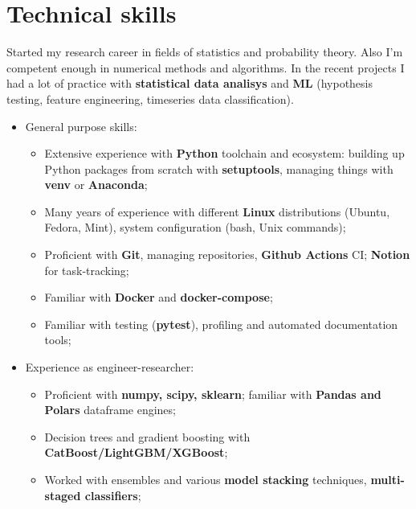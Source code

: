 \documentclass[12pt,a4paper,sans]{moderncv}
\begin{document}
\section{Technical skills}
\hspace{10mm} Started my research career in fields of statistics and probability theory. Also I'm competent enough in numerical methods and algorithms. \newline
In the recent projects I had a lot of practice with \textbf{statistical data analisys} and \textbf{ML} (hypothesis testing, feature engineering, timeseries data classification). \newline
 \begin{itemize}
 \item General purpose skills: \newline
    \begin{itemize}
        \item Extensive experience with \textbf{Python} toolchain and ecosystem: building up Python packages from scratch with \textbf{setuptools},
managing things with \textbf{venv} or \textbf{Anaconda}; \newline
        \item Many years of experience with different \textbf{Linux} distributions (Ubuntu, Fedora, Mint), system configuration (bash, Unix commands); \newline
        \item Proficient with \textbf{Git}, managing repositories, \textbf{Github Actions} CI; \textbf{Notion} for task-tracking; \newline
        \item Familiar with \textbf{Docker} and \textbf{docker-compose}; \newline
        \item Familiar with testing (\textbf{pytest}), profiling and automated documentation tools; \newline
    \end{itemize}    
 \item Experience as engineer-researcher:\newline
    \begin{itemize}
        \item Proficient with \textbf{numpy, scipy, sklearn}; familiar with \textbf{Pandas and Polars} dataframe engines;
        \item Decision trees and gradient boosting with \textbf{CatBoost/LightGBM/XGBoost}; 
        \item Worked with ensembles and various \textbf{model stacking} techniques, \textbf{multi-staged classifiers}; \newline

\end{itemize}
\end{itemize}
\end{document}

